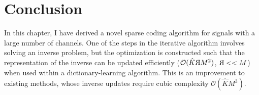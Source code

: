 \section{Conclusion}
In this chapter, I have derived a novel sparse coding algorithm for signals with a large number of channels. One of the steps in the iterative algorithm involves solving an inverse problem, but the optimization is constructed such that the representation of the inverse can be updated efficiently ($\mathcal{O}(\hat{K}
\reflectbox{R}M^2)$, $
\reflectbox{R} << M$) when used within a dictionary-learning algorithm. This is an improvement to existing methods, whose inverse updates require cubic complexity $\mathcal{O}(\hat{K}M^3)$.
